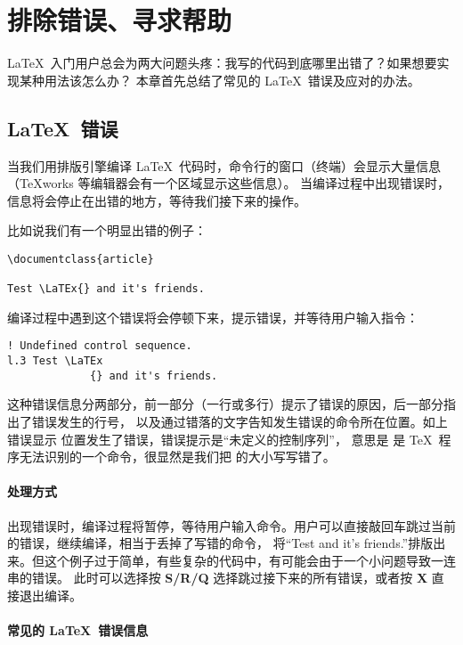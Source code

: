 \chapter{排除错误、寻求帮助}\label{chap:error-helps}

\begin{intro}
\LaTeX\ 入门用户总会为两大问题头疼：我写的代码到底哪里出错了？如果想要实现某种用法该怎么办？
本章首先总结了常见的 \LaTeX\ 错误及应对的办法。
\end{intro}

\section{\LaTeX\ 错误}\label{sec:errors}

当我们用排版引擎编译 \LaTeX\ 代码时，命令行的窗口（终端）会显示大量信息（\TeX works 等编辑器会有一个区域显示这些信息）。
当编译过程中出现错误时，信息将会停止在出错的地方，等待我们接下来的操作。

比如说我们有一个明显出错的例子：
\begin{verbatim}
\documentclass{article}

Test \LaTEx{} and it's friends.

\end{verbatim}

编译过程中遇到这个错误将会停顿下来，提示错误，并等待用户输入指令：
\begin{verbatim}
! Undefined control sequence.
l.3 Test \LaTEx
             {} and it's friends.
\end{verbatim}

这种错误信息分两部分，前一部分（一行或多行）提示了错误的原因，后一部分指出了错误发生的行号，
以及通过错落的文字告知发生错误的命令所在位置。如上错误显示  位置发生了错误，错误提示是“未定义的控制序列”，
意思是  是 \TeX\ 程序无法识别的一个命令，很显然是我们把  的大小写写错了。

\subsubsection{处理方式}

出现错误时，编译过程将暂停，等待用户输入命令。用户可以直接敲回车跳过当前的错误，继续编译，相当于丢掉了写错的命令，
将``Test and it's friends.''排版出来。但这个例子过于简单，有些复杂的代码中，有可能会由于一个小问题导致一连串的错误。
此时可以选择按 \textbf{S/R/Q} 选择跳过接下来的所有错误，或者按 \textbf{X} 直接退出编译。

\subsubsection{常见的 \LaTeX\ 错误信息}

